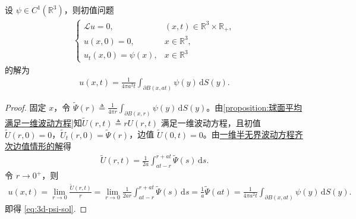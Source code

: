 \documentclass[../../main.tex]{subfiles}%
\begin{document}
\begin{proposition}
设 $\psi\in C^1(\mathbb{R}^3)$，则初值问题
\begin{align}
\begin{cases}
\mathcal{L}u=0, & (x,t)\in\mathbb{R}^3\times\mathbb{R}_+, \\
u(x,0)=0, & x\in\mathbb{R}^3, \\
u_t(x,0)=\psi(x), & x\in\mathbb{R}^3
\end{cases} \label{eq:3d-psi}
\end{align}
的解为
\begin{align}
u(x,t)=\frac{1}{4\pi a^2t}\int_{\partial B(x,at)}\psi(y)\,\mathrm{d}S(y). \label{eq:3d-psi-sol}
\end{align}
\end{proposition}
\begin{proof}
固定 $x$，令 $\widetilde{\Psi}(r)\triangleq \frac{1}{4\pi r}\int_{\partial B(x,r)}\psi(y)\,\mathrm{d}S(y)$。由\cref{proposition:球面平均满足一维波动方程}知$\widetilde{U}(r,t)\triangleq rU(r,t)$ 满足一维波动方程，且初值 $\widetilde{U}(r,0)=0$，$\widetilde{U}_t(r,0)=\widetilde{\Psi}(r)$，边值 $\widetilde{U}(0,t)=0$。由\hyperref[theroem:一维半无界波动方程齐次边值情形的解]{一维半无界波动方程齐次边值情形的解}得
\begin{align*}
\widetilde{U}(r,t)=\frac{1}{2a}\int_{at-r}^{r+at}\widetilde{\Psi}(s)\,\mathrm{d}s.
\end{align*}
令 $r\to 0^+$，则
\begin{align*}
u(x,t)=\lim_{r\to0}\frac{\widetilde{U}(r,t)}{r}
=\lim_{r\to0}\frac{1}{2ar}\int_{at-r}^{r+at}\widetilde{\Psi}(s)\,\mathrm{d}s
=\frac{1}{a}\widetilde{\Psi}(at)
=\frac{1}{4\pi a^2t}\int_{\partial B(x,at)}\psi(y)\,\mathrm{d}S(y).
\end{align*}
即得 \eqref{eq:3d-psi-sol}.
\end{proof}
\end{document}
